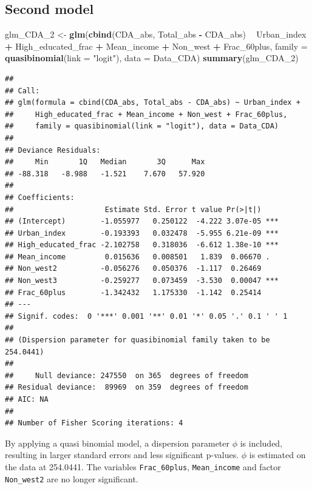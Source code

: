 \documentclass[11pt,]{article}
\newenvironment{Shaded}{\begin{snugshade}}{\end{snugshade}}
\newcommand{\KeywordTok}[1]{\textcolor[rgb]{0.13,0.29,0.53}{\textbf{#1}}}
\newcommand{\DataTypeTok}[1]{\textcolor[rgb]{0.13,0.29,0.53}{#1}}
\newcommand{\DecValTok}[1]{\textcolor[rgb]{0.00,0.00,0.81}{#1}}
\newcommand{\StringTok}[1]{\textcolor[rgb]{0.31,0.60,0.02}{#1}}
\newcommand{\OperatorTok}[1]{\textcolor[rgb]{0.81,0.36,0.00}{\textbf{#1}}}
\newcommand{\NormalTok}[1]{#1}
\begin{document}
\subsection{Second model}\label{second-model-1}

\begin{Shaded}
\begin{Highlighting}[]
\NormalTok{glm_CDA_}\DecValTok{2}\NormalTok{ <-}\StringTok{ }\KeywordTok{glm}\NormalTok{(}\KeywordTok{cbind}\NormalTok{(CDA_abs, Total_abs }\OperatorTok{-}\StringTok{ }\NormalTok{CDA_abs) }\OperatorTok{~}\StringTok{ }\NormalTok{Urban_index }\OperatorTok{+}\StringTok{ }\NormalTok{High_educated_frac }\OperatorTok{+}\StringTok{ }
\StringTok{    }\NormalTok{Mean_income }\OperatorTok{+}\StringTok{ }\NormalTok{Non_west }\OperatorTok{+}\StringTok{ }\NormalTok{Frac_60plus, }\DataTypeTok{family =} \KeywordTok{quasibinomial}\NormalTok{(}\DataTypeTok{link =} \StringTok{"logit"}\NormalTok{), }
    \DataTypeTok{data =}\NormalTok{ Data_CDA)}
\KeywordTok{summary}\NormalTok{(glm_CDA_}\DecValTok{2}\NormalTok{)}
\end{Highlighting}
\end{Shaded}

\begin{verbatim}
## 
## Call:
## glm(formula = cbind(CDA_abs, Total_abs - CDA_abs) ~ Urban_index + 
##     High_educated_frac + Mean_income + Non_west + Frac_60plus, 
##     family = quasibinomial(link = "logit"), data = Data_CDA)
## 
## Deviance Residuals: 
##     Min       1Q   Median       3Q      Max  
## -88.318   -8.988   -1.521    7.670   57.920  
## 
## Coefficients:
##                     Estimate Std. Error t value Pr(>|t|)    
## (Intercept)        -1.055977   0.250122  -4.222 3.07e-05 ***
## Urban_index        -0.193393   0.032478  -5.955 6.21e-09 ***
## High_educated_frac -2.102758   0.318036  -6.612 1.38e-10 ***
## Mean_income         0.015636   0.008501   1.839  0.06670 .  
## Non_west2          -0.056276   0.050376  -1.117  0.26469    
## Non_west3          -0.259277   0.073459  -3.530  0.00047 ***
## Frac_60plus        -1.342432   1.175330  -1.142  0.25414    
## ---
## Signif. codes:  0 '***' 0.001 '**' 0.01 '*' 0.05 '.' 0.1 ' ' 1
## 
## (Dispersion parameter for quasibinomial family taken to be 254.0441)
## 
##     Null deviance: 247550  on 365  degrees of freedom
## Residual deviance:  89969  on 359  degrees of freedom
## AIC: NA
## 
## Number of Fisher Scoring iterations: 4
\end{verbatim}

By applying a quasi binomial model, a dispersion parameter \(\phi\) is
included, resulting in larger standard errors and less significant
p-values. \(\phi\) is estimated on the data at 254.0441. The variables
\texttt{Frac\_60plus}, \texttt{Mean\_income} and factor
\texttt{Non\_west2} are no longer significant.
\end{document}
